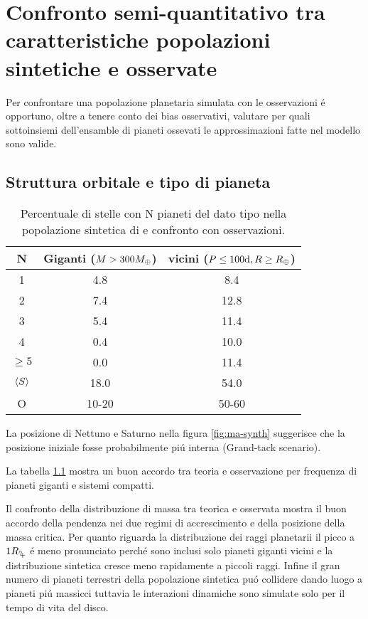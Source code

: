 {\let\clearpage\relax\let\cleardoublepage\relax
\chapter{Confronto semi-quantitativo tra caratteristiche popolazioni sintetiche e osservate}
}

Per confrontare una popolazione planetaria simulata con le osservazioni \'e opportuno, oltre a tenere conto dei bias osservativi, valutare per quali sottoinsiemi dell'ensamble di pianeti ossevati le approssimazioni fatte nel modello sono valide.

\section{Struttura orbitale e tipo di pianeta}

\begin{table}
\begin{tabular}{|ccc|}
\hline
N&Giganti ($M>300M_{\oplus}{}$)&vicini ($P\leq100\si{\day}, R\geq\rearth{}$)\\
\hline
1&4.8&8.4\\
2&7.4&12.8\\
3&5.4&11.4\\
4&0.4&10.0\\
$\geq5$&0.0&11.4\\
$\langle S \rangle$&18.0&54.0\\
O&10-20&50-60\\
\hline
\end{tabular}
\caption{Percentuale di stelle con N pianeti del dato tipo nella popolazione sintetica di \cite{mordasini2018planetary} e confronto con osservazioni.}\label{tab:planetfreq}
\end{table}

La posizione di Nettuno e Saturno nella figura \ref{fig:ma-synth} suggerisce che la posizione iniziale fosse probabilmente pi\'u interna (Grand-tack scenario).

La tabella \ref{tab:planetfreq} mostra un buon accordo tra teoria e osservazione per frequenza di pianeti giganti e sistemi compatti.

Il confronto della distribuzione di massa tra teorica e osservata mostra il buon accordo della pendenza nei due regimi di accrescimento e della posizione della massa critica. Per quanto riguarda la distribuzione dei raggi planetarii il picco a $1\rjupiter{}$ \'e meno pronunciato perch\'e sono inclusi solo pianeti giganti vicini e la distribuzione sintetica cresce meno rapidamente a piccoli raggi. Infine il gran numero di pianeti terrestri della popolazione sintetica pu\'o collidere dando luogo a pianeti pi\'u massicci tuttavia le interazioni dinamiche sono simulate solo per il tempo di vita del disco.

